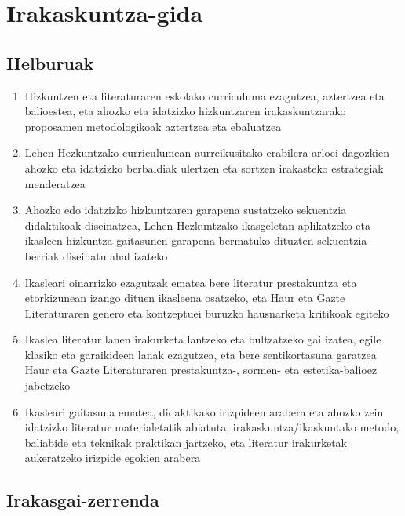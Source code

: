 \documentclass[
]{book}
\providecommand{\tightlist}{%
  \setlength{\itemsep}{0pt}\setlength{\parskip}{0pt}}
\begin{document}
\hypertarget{irakaskuntza-gida}{%
\section*{Irakaskuntza-gida}\label{irakaskuntza-gida}}

\hypertarget{helburuak}{%
\subsection*{Helburuak}\label{helburuak}}

\begin{enumerate}
\def\labelenumi{\Alph{enumi})}
\tightlist
\item
  Hizkuntzen eta literaturaren eskolako curriculuma ezagutzea, aztertzea eta balioestea, eta ahozko eta idatzizko hizkuntzaren irakaskuntzarako proposamen metodologikoak aztertzea eta ebaluatzea
\item
  Lehen Hezkuntzako curriculumean aurreikusitako erabilera arloei dagozkien ahozko eta idatzizko berbaldiak ulertzen eta sortzen irakasteko estrategiak menderatzea
\item
  Ahozko edo idatzizko hizkuntzaren garapena sustatzeko sekuentzia didaktikoak diseinatzea, Lehen Hezkuntzako ikasgeletan aplikatzeko eta ikasleen hizkuntza-gaitasunen garapena bermatuko dituzten sekuentzia berriak diseinatu ahal izateko
\item
  Ikasleari oinarrizko ezagutzak ematea bere literatur prestakuntza eta etorkizunean izango dituen ikasleena osatzeko, eta Haur eta Gazte Literaturaren genero eta kontzeptuei buruzko hausnarketa kritikoak egiteko
\item
  Ikaslea literatur lanen irakurketa lantzeko eta bultzatzeko gai izatea, egile klasiko eta garaikideen lanak ezagutzea, eta bere sentikortasuna garatzea Haur eta Gazte Literaturaren prestakuntza-, sormen- eta estetika-balioez jabetzeko
\item
  Ikasleari gaitasuna ematea, didaktikako irizpideen arabera eta ahozko zein idatzizko literatur materialetatik abiatuta, irakaskuntza/ikaskuntako metodo, baliabide eta teknikak praktikan jartzeko, eta literatur irakurketak aukeratzeko irizpide egokien arabera
\end{enumerate}

\hypertarget{irakasgai-zerrenda}{%
\subsection*{Irakasgai-zerrenda}\label{irakasgai-zerrenda}}
\end{document}
